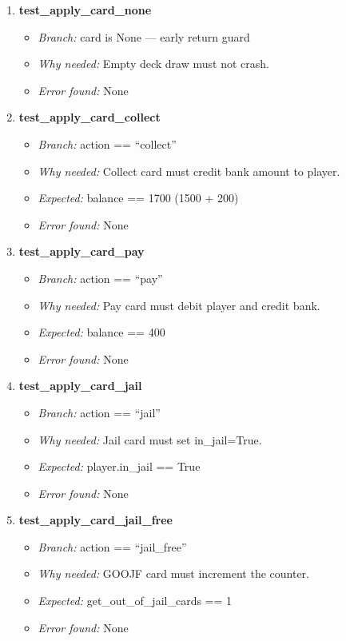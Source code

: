 \documentclass{article}
\begin{document}
\begin{enumerate}[resume, label=\textbf{TC\arabic*.}]

  \item \textbf{test\_apply\_card\_none}
  \begin{itemize}[noitemsep]
    \item \textit{Branch:} card is None — early return guard
    \item \textit{Why needed:} Empty deck draw must not crash.
    \item \textit{Error found:} None
  \end{itemize}

  \item \textbf{test\_apply\_card\_collect}
  \begin{itemize}[noitemsep]
    \item \textit{Branch:} action == ``collect''
    \item \textit{Why needed:} Collect card must credit bank amount to player.
    \item \textit{Expected:} balance == 1700 (1500 + 200)
    \item \textit{Error found:} None
  \end{itemize}

  \item \textbf{test\_apply\_card\_pay}
  \begin{itemize}[noitemsep]
    \item \textit{Branch:} action == ``pay''
    \item \textit{Why needed:} Pay card must debit player and credit bank.
    \item \textit{Expected:} balance == 400
    \item \textit{Error found:} None
  \end{itemize}

  \item \textbf{test\_apply\_card\_jail}
  \begin{itemize}[noitemsep]
    \item \textit{Branch:} action == ``jail''
    \item \textit{Why needed:} Jail card must set in\_jail=True.
    \item \textit{Expected:} player.in\_jail == True
    \item \textit{Error found:} None
  \end{itemize}

  \item \textbf{test\_apply\_card\_jail\_free}
  \begin{itemize}[noitemsep]
    \item \textit{Branch:} action == ``jail\_free''
    \item \textit{Why needed:} GOOJF card must increment the counter.
    \item \textit{Expected:} get\_out\_of\_jail\_cards == 1
    \item \textit{Error found:} None
  \end{itemize}


\end{enumerate}
\end{document}
